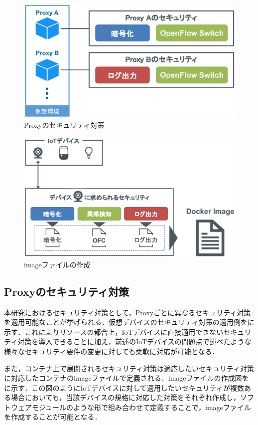 \documentclass[Japanese]{dicomopapers}
\begin{document}
\begin{figure}[!tb]
	\centering
	\includegraphics[width=\linewidth]{img/security.eps}
	\caption{Proxyのセキュリティ対策}
	\label{fig:security}
\end{figure}

\begin{figure}[!tb]
	\centering
	\includegraphics[width=\linewidth]{img/dockerimage.eps}
	\caption{imageファイルの作成}
	\label{fig:dockerimage}
\end{figure}

\subsection{Proxyのセキュリティ対策}
本研究におけるセキュリティ対策として，Proxyごとに異なるセキュリティ対策を適用可能なことが挙げられる．仮想デバイスのセキュリティ対策の適用例をに示す．これによりリソースの都合上，IoTデバイスに直接適用できないセキュリティ対策を導入できることに加え，前述のIoTデバイスの問題点で述べたような様々なセキュリティ要件の変更に対しても柔軟に対応が可能となる．\par
また，コンテナ上で展開されるセキュリティ対策は適応したいセキュリティ対策に対応したコンテナのimageファイルで定義される．imageファイルの作成図をに示す．この図のようにIoTデバイスに対して適用したいセキュリティが複数ある場合においても，当該デバイスの規格に対応した対策をそれぞれ作成し，ソフトウェアモジュールのような形で組み合わせて定義することで，imageファイルを作成することが可能となる．
\end{document}
